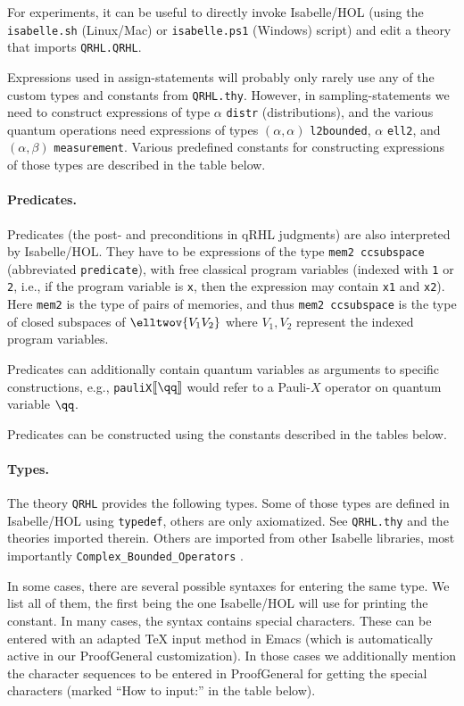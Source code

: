 \documentclass{article}
\begin{document}
For experiments, it can be useful to directly invoke Isabelle/HOL
(using the \texttt{isabelle.sh} (Linux/Mac) or \texttt{isabelle.ps1} (Windows) script) and edit a theory that
imports \texttt{QRHL.QRHL}.

Expressions used in assign-statements will probably only rarely use
any of the custom types and constants from \texttt{QRHL.thy}.
However, in sampling-statements we need to construct
expressions of type $\alpha$
\texttt{distr} (distributions), and the various quantum operations
need expressions of types $(\alpha,\alpha)$
\texttt{l2bounded}, $\alpha$
\texttt{ell2}, and $(\alpha,\beta)$
\texttt{measurement}. Various predefined constants for constructing
expressions of those types are described in the table below.


\paragraph{Predicates.} Predicates (the post- and preconditions in
qRHL judgments) are also interpreted by Isabelle/HOL. They have to be
expressions of the type \texttt{mem2 ccsubspace} (abbreviated \texttt{predicate}),
with free classical
program variables (indexed with \texttt{1} or \texttt{2}, i.e., if the
program variable is \texttt{x}, then the expression may contain
\texttt{x1} and \texttt{x2}). Here \texttt{mem2} is the type of pairs
of memories, and thus \texttt{mem2 ccsubspace} is the type of closed subspaces of
$\elltwov{V_1V_2}$
where $V_1,V_2$ represent the indexed program variables.

Predicates can additionally contain quantum variables as arguments to
specific constructions, e.g., \texttt{pauliX\guillemotright$\llbracket\qq\rrbracket$}
would refer to a Pauli-$X$ operator on quantum variable $\qq$.

Predicates can be constructed using the constants described in the
tables below.



\paragraph{Types.} The theory \texttt{QRHL} provides the following
types. Some of those types are defined in Isabelle/HOL using
\texttt{typedef}, others are only axiomatized.
See \texttt{QRHL.thy} and the theories imported therein.
Others are imported from other Isabelle libraries, most importantly \texttt{Complex\_Bounded\_Operators} \cite{bounded-operators}.

In some cases, there
are several possible syntaxes for entering the same type. We list
all of them, the first being the one Isabelle/HOL will use for
printing the constant. In many cases, the syntax contains special
characters. These can be entered with an adapted TeX input method in Emacs
(which is automatically active in our ProofGeneral customization). In
those cases we additionally mention the character sequences to be entered in ProofGeneral
for getting the special characters (marked ``How to input:'' in the table below).
\end{document}
